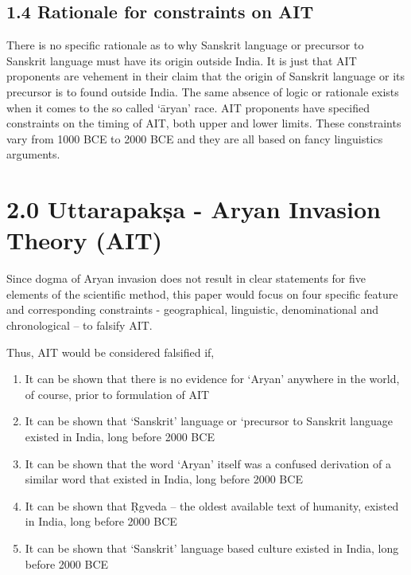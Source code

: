 \subsection*{1.4 Rationale for constraints on AIT}

There is no specific rationale as to why Sanskrit language or precursor to Sanskrit language must have its origin outside India. It is just that AIT proponents are vehement in their claim that the origin of Sanskrit language or its precursor is to found outside India. The same absence of logic or rationale exists when it comes to the so called ‘āryan’ race. AIT proponents have specified constraints on the timing of AIT, both upper and lower limits. These constraints vary from 1000 BCE to 2000 BCE and they are all based on fancy linguistics arguments.


\section*{2.0 Uttarapakṣa - Aryan Invasion Theory (AIT)}

Since dogma of Aryan invasion does not result in clear statements for five elements of the scientific method, this paper would focus on four specific feature and corresponding constraints - geographical, linguistic, denominational and chronological – to falsify AIT.

Thus, AIT would be considered falsified if,

\begin{enumerate}[{\rm 1)}]
\itemsep=0pt
\item It can be shown that there is no evidence for ‘Aryan’ anywhere in the world, of course, prior to formulation of AIT

 \item It can be shown that ‘Sanskrit’ language or ‘precursor to Sanskrit language existed in India, long before 2000 BCE

 \item It can be shown that the word ‘Aryan’ itself was a confused derivation of a similar word that existed in India, long before 2000 BCE

 \item It can be shown that Ṛgveda – the oldest available text of humanity, existed in India, long before 2000 BCE

 \item It can be shown that ‘Sanskrit’ language based culture existed in India, long before 2000 BCE

\end{enumerate}


